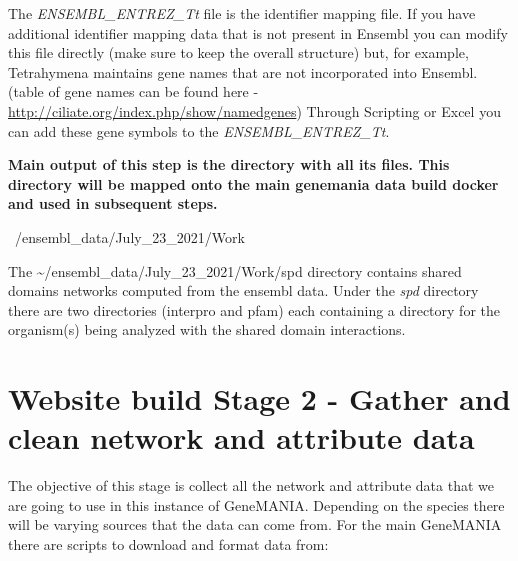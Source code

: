 \documentclass[]{book}
\newenvironment{Shaded}{\begin{snugshade}}{\end{snugshade}}
\newcommand{\ExtensionTok}[1]{#1}
\begin{document}
The \emph{ENSEMBL\_ENTREZ\_Tt} file is the identifier mapping file. If
you have additional identifier mapping data that is not present in
Ensembl you can modify this file directly (make sure to keep the overall
structure) but, for example, Tetrahymena maintains gene names that are
not incorporated into Ensembl. (table of gene names can be found here -
\url{http://ciliate.org/index.php/show/namedgenes}) Through Scripting or
Excel you can add these gene symbols to the \emph{ENSEMBL\_ENTREZ\_Tt}.

\textbf{Main output of this step is the directory with all its files.
This directory will be mapped onto the main genemania data build docker
and used in subsequent steps.}

\begin{Shaded}
\begin{Highlighting}[]
\ExtensionTok{~/ensembl_data/July_23_2021/Work}
\end{Highlighting}
\end{Shaded}

The \textasciitilde{}/ensembl\_data/July\_23\_2021/Work/spd directory
contains shared domains networks computed from the ensembl data. Under
the \emph{spd} directory there are two directories (interpro and pfam)
each containing a directory for the organism(s) being analyzed with the
shared domain interactions.

\chapter{Website build Stage 2 - Gather and clean network and attribute
data}\label{website-build-stage-2---gather-and-clean-network-and-attribute-data}

The objective of this stage is collect all the network and attribute
data that we are going to use in this instance of GeneMANIA. Depending
on the species there will be varying sources that the data can come
from. For the main GeneMANIA there are scripts to download and format
data from:
\end{document}
